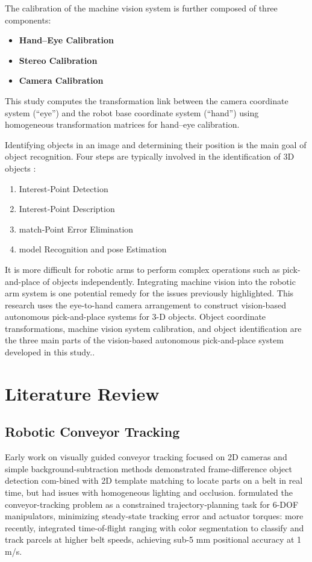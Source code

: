 \documentclass[12pt]{article}
\begin{document}
The calibration of the machine vision system is further composed of three components\cite{ref12}:
\begin{itemize}
  \item \textbf{Hand–Eye Calibration}
  \item \textbf{Stereo Calibration}
  \item \textbf{Camera Calibration}
\end{itemize}

This study computes the transformation link between the camera coordinate system (``eye'') and the robot base coordinate system (``hand'') using homogeneous transformation matrices for hand–eye calibration\cite{ref12}.

Identifying objects in an image and determining their position is the main goal of object recognition. Four steps are typically involved in the identification of 3D objects \cite{ref12}:
\begin{enumerate}
  \item Interest‑Point Detection 
  \item Interest‑Point Description 
  \item match‑Point Error Elimination 
  \item model Recognition and pose Estimation 
\end{enumerate}
It is more difficult for robotic arms to perform complex operations such as pick-and-place of objects independently.  Integrating machine vision into the robotic arm system is one potential remedy for the issues previously highlighted. This research uses the eye-to-hand camera arrangement to construct vision-based autonomous pick-and-place systems for 3-D objects. Object coordinate transformations, machine vision system calibration, and object identification are the three main parts of the vision-based autonomous pick-and-place system developed in this study.\cite{ref12}.
\newpage

\section{Literature Review}
\subsection{Robotic Conveyor Tracking}
Early work on visually guided conveyor tracking focused on 2D cameras and simple background-subtraction methods\cite{ref12} demonstrated frame-difference object detection com-bined with 2D template matching to locate parts on a belt in real time, but had issues with homogeneous lighting and occlusion.\cite{ref14} formulated the conveyor-tracking problem as a constrained trajectory‐planning task for 6-DOF manipulators, minimizing steady-state tracking error and actuator torques: more recently,\cite{ref9} integrated time-of-flight ranging with color segmentation to classify and track parcels at higher belt speeds, achieving sub-5 mm positional accuracy at 1 m/s.\\
\end{document}
